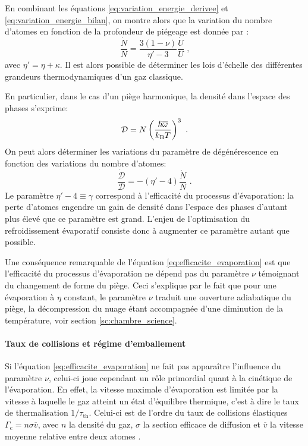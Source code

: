 En combinant les équations \ref{eq:variation_energie_derivee} et \ref{eq:variation_energie_bilan}, on montre alors que la variation du nombre d'atomes en fonction de la profondeur de piégeage est donnée par \citep{o2001scaling}:
\begin{equation}
\frac{\dot{N}}{N}={\frac{3(1-\nu)}{\eta'-3}} \frac{\dot{U}}{U} \text{ ,}
\end{equation}
avec $\eta'=\eta+\kappa$. Il est alors possible de déterminer les lois d'échelle des différentes grandeurs thermodynamiques d'un gaz classique. 

En particulier, dans le cas d'un piège harmonique, la densité dans l'espace des phases s'exprime:
\begin{equation}
\mathcal{D}=N\left(\frac{\hslash \overline{\omega}}{k_{\mathrm{B}} T}\right)^3 \text{ .}
\end{equation}
On peut alors déterminer les variations du paramètre de dégénérescence en fonction des variations du nombre d'atomes: 
\begin{equation}
\frac{\dot{\mathcal{D}}}{\mathcal{D}} = -(\eta'-4) \frac{\dot{N}}{N} \text{ .}
\label{eq:efficacite_evaporation}
\end{equation}
Le paramètre $\eta'-4 \equiv \gamma$ correspond à l'efficacité du processus d'évaporation: la perte d'atomes engendre un gain de densité dans l'espace des phases d'autant plus élevé que ce paramètre est grand. L'enjeu de l'optimisation du refroidissement évaporatif consiste donc à augmenter ce paramètre autant que possible.

Une conséquence remarquable de l'équation \ref{eq:efficacite_evaporation} est que l'efficacité du processus d'évaporation ne dépend pas du paramètre $\nu$ témoignant du changement de forme du piège. Ceci s'explique par le fait que pour une évaporation à $\eta$ constant, le paramètre $\nu$ traduit une ouverture adiabatique du piège, la décompression du nuage étant accompagnée d'une diminution de la température, voir section \ref{sc:chambre_science}. 


\paragraph*{Taux de collisions et régime d'emballement}
Si l'équation \ref{eq:efficacite_evaporation} ne fait pas apparaître l'influence du paramètre $\nu$, celui-ci joue cependant un rôle primordial quant à la cinétique de l'évaporation. En effet, la vitesse maximale d'évaporation est limitée par la vitesse à laquelle le gaz atteint un état d'équilibre thermique, c'est à dire le taux de thermalisation $1/\tau_{\mathrm{th}}$. Celui-ci est de l'ordre du taux de collisions élastiques $\Gamma_{\mathrm{c}}=n \sigma \overline{v}$, avec $n$ la densité du gaz, $\sigma$ la section efficace de diffusion et $\overline{v}$ la vitesse moyenne relative entre deux atomes \citep{walraven2010elements}. 

